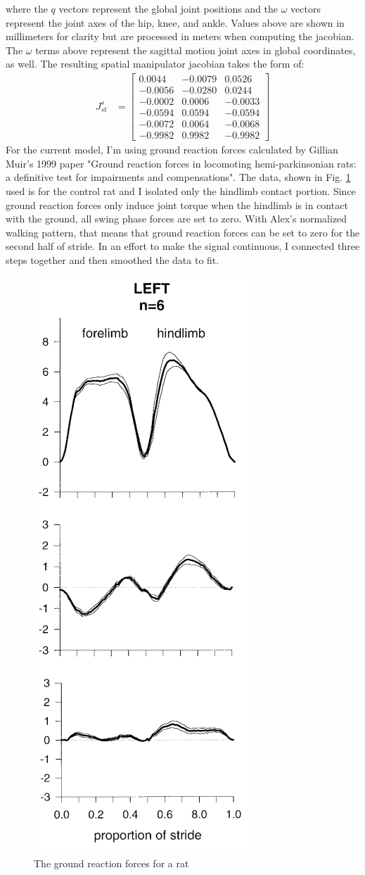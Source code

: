 \documentclass[runningheads,a4paper]{llncs}
\begin{document}
	where the $q$ vectors represent the global joint positions and the $\omega$ vectors represent the joint axes of the hip, knee, and ankle. Values above are shown in millimeters for clarity but are processed in meters when computing the jacobian. The $\omega$ terms above represent the sagittal motion joint axes in global coordinates, as well. The resulting spatial manipulator jacobian takes the form of:
		\begin{align*}
			J^{s}_{st} &= 
				\begin{bmatrix}
				    0.0044  & -0.0079  &  0.0526 \\
				   -0.0056  & -0.0280  &  0.0244 \\
				   -0.0002  &  0.0006  & -0.0033 \\
				   -0.0594  &  0.0594  & -0.0594 \\
				   -0.0072  &  0.0064  & -0.0068 \\
				   -0.9982  &  0.9982  & -0.9982
				\end{bmatrix}
		\end{align*}
	For the current model, I'm using ground reaction forces calculated by Gillian Muir's 1999 paper "Ground reaction forces in locomoting hemi-parkinsonian rats: a definitive test for impairments and compensations"\cite{muir_ground_1999}. The data, shown in Fig. \ref{fig:grfdata} used is for the control rat and I isolated only the hindlimb contact portion. Since ground reaction forces only induce joint torque when the hindlimb is in contact with the ground, all swing phase forces are set to zero. With Alex's normalized walking pattern, that means that ground reaction forces can be set to zero for the second half of stride. In an effort to make the signal continuous, I connected three steps together and then smoothed the data to fit.
		\begin{figure}
			\centering
			\includegraphics[width=.3\textwidth]{loadt3.PNG}
			\caption{The ground reaction forces for a rat}
			\label{fig:grfdata}
		\end{figure}
\end{document}
